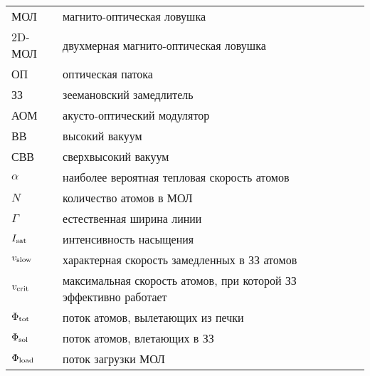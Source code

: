

 
\begin{tabular}{lll}
	МОЛ & магнито-оптическая ловушка & \pageref{subsec:мол} \\ 
	2D-МОЛ  & двухмерная магнито-оптическая ловушка & \\ 
	ОП  & оптическая патока & \\ 
	ЗЗ & зеемановский замедлитель & \\
	АОМ & акусто-оптический модулятор & \\
	ВВ & высокий вакуум & \\
	СВВ & сверхвысокий вакуум & \\
	$\alpha$ & наиболее вероятная тепловая скорость атомов & \pageref{Поток атомов на выходе}\\ 
	$N$ & количество атомов в МОЛ & \\
	$\Gamma$ & естественная ширина линии & \\
	$I_{\textnormal{sat}}$ & интенсивность насыщения & \\
	$v_{\textnormal{slow}}$ &  характерная скорость замедленных в ЗЗ атомов & \pageref{Тормозящая сила} \\
	$v_{\textnormal{crit}}$ & максимальная скорость атомов, при которой ЗЗ эффективно работает  & \pageref{Тормозящая сила} \\
	$\Phi_{\textnormal{tot}}$ & поток атомов, вылетающих из печки & \\
	$\Phi_{\textnormal{sol}}$ & поток атомов, влетающих в ЗЗ & \pageref{Поток атомов на выходе} \\
	$\Phi_{\textnormal{load}}$ & поток загрузки МОЛ & \pageref{Динамика количества атомов в МОЛ} \\
\end{tabular}

\cite{koepsell_quantum_nodate}

\cite{Koepsell_2019}